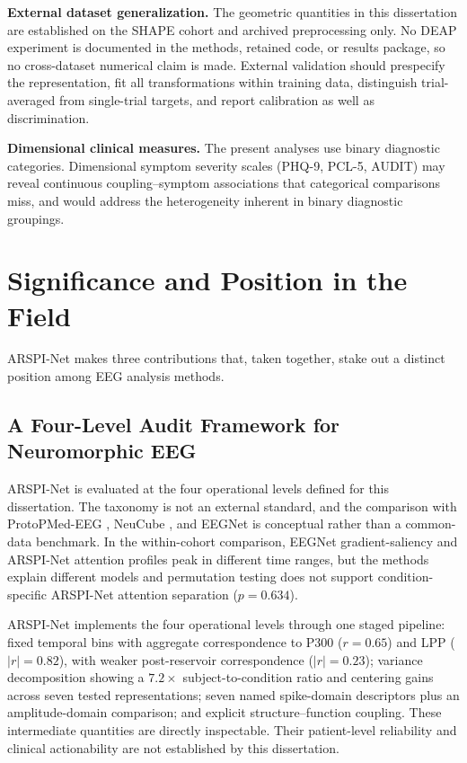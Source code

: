 \textbf{External dataset generalization.} The geometric quantities in this dissertation are established on the SHAPE cohort and archived preprocessing only. No DEAP experiment is documented in the methods, retained code, or results package, so no cross-dataset numerical claim is made. External validation should prespecify the representation, fit all transformations within training data, distinguish trial-averaged from single-trial targets, and report calibration as well as discrimination.

\textbf{Dimensional clinical measures.} The present analyses use binary diagnostic categories. Dimensional symptom severity scales (PHQ-9, PCL-5, AUDIT) may reveal continuous coupling--symptom associations that categorical comparisons miss, and would address the heterogeneity inherent in binary diagnostic groupings.


\section{Significance and Position in the Field}
\label{sec:significance}

ARSPI-Net makes three contributions that, taken together, stake out a distinct position among EEG analysis methods.

\subsection{A Four-Level Audit Framework for Neuromorphic EEG}

ARSPI-Net is evaluated at the four operational levels defined for this dissertation. The taxonomy is not an external standard, and the comparison with ProtoPMed-EEG \cite{barnett_protopmed_2024}, NeuCube \cite{kasabov_neucube_2014}, and EEGNet is conceptual rather than a common-data benchmark. In the within-cohort comparison, EEGNet gradient-saliency and ARSPI-Net attention profiles peak in different time ranges, but the methods explain different models and permutation testing does not support condition-specific ARSPI-Net attention separation ($p=0.634$).

ARSPI-Net implements the four operational levels through one staged pipeline: fixed temporal bins with aggregate correspondence to P300 ($r = 0.65$) and LPP ($|r| = 0.82$), with weaker post-reservoir correspondence ($|r| = 0.23$); variance decomposition showing a $7.2\times$ subject-to-condition ratio and centering gains across seven tested representations; seven named spike-domain descriptors plus an amplitude-domain comparison; and explicit structure--function coupling. These intermediate quantities are directly inspectable. Their patient-level reliability and clinical actionability are not established by this dissertation.

